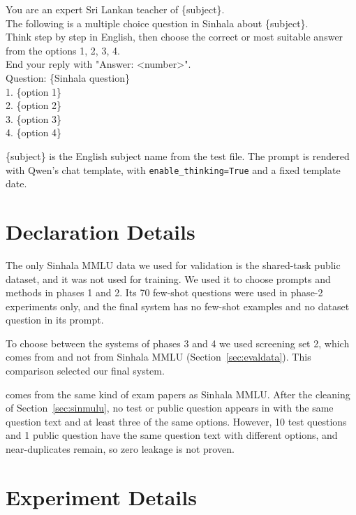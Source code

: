 \smallskip
{\footnotesize\ttfamily\raggedright\noindent
You are an expert Sri Lankan teacher of \{subject\}.\\
The following is a multiple choice question in Sinhala about \{subject\}.\\
Think step by step in English, then choose the correct or most suitable answer from the options 1, 2, 3, 4.\\
End your reply with "Answer: <number>".\\[2pt]
Question: \{Sinhala question\}\\
1. \{option 1\}\\
2. \{option 2\}\\
3. \{option 3\}\\
4. \{option 4\}\par}

\smallskip\noindent\{subject\} is the English subject name from the test file. The prompt is rendered with Qwen's chat template, with \texttt{enable\_thinking=True} and a fixed template date.

\section{Declaration Details}\label{app:decl}
 The only Sinhala MMLU data we used for validation is the shared-task public dataset, and it was not used for training. We used it to choose prompts and methods in phases 1 and 2. Its 70 few-shot questions were used in phase-2 experiments only, and the final system has no few-shot examples and no dataset question in its prompt.

To choose between the systems of phases 3 and 4 we used screening set 2, which comes from \sinmulu{} and not from Sinhala MMLU (Section~\ref{sec:evaldata}). This comparison selected our final system.

 \sinmulu{} comes from the same kind of exam papers as Sinhala MMLU. After the cleaning of Section~\ref{sec:sinmulu}, no test or public question appears in \sinmulu{} with the same question text and at least three of the same options. However, 10 test questions and 1 public question have the same question text with different options, and near-duplicates remain, so zero leakage is not proven.

\section{Experiment Details}\label{app:details}

